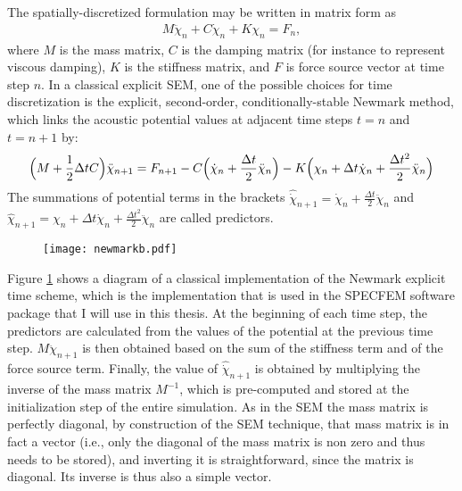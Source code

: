             The spatially-discretized formulation may be written in matrix form as
            \begin{align} \label{eq:sem_35}
                M\ddot{\chi}_{n}+C\dot{\chi}_{n}+K\chi_{n}=F_{n},
            \end{align}
            where $M$ is the mass matrix, $C$ is the damping matrix (for instance to represent viscous damping), $K$ is the stiffness matrix,
and $F$ is force source vector at time step $n$.
In a classical explicit SEM,
one of the possible choices for time discretization is the explicit, second-order, conditionally-stable Newmark method, which links the acoustic potential values at
adjacent time steps $t=n$ and $t=n+1$ \citep{Hug87} by:
            \begin{align} \label{eq:sem_36}
                \Bigl( M+\frac{1}{2}\Delta t C \Bigr)\ddot{\chi}_{n+1} = F_{n+1}-C\Bigl( \dot{\chi}_n+\frac{\Delta t}{2}\ddot{\chi}_n\Bigr)-K\Bigl(
\chi_n+\Delta t \dot{\chi}_n+\frac{\Delta t^2}{2}\ddot{\chi}_n\Bigr)
            \end{align}
            The summations of potential terms in the brackets $\hat{\dot{\chi}}_{n+1}=\dot{\chi}_n + \frac{\Delta t}{2} \ddot{\chi}_n$ and $\hat{\chi}_{n+1} =
\chi_{n}+ \Delta t \dot{\chi}_n + \frac{\Delta t^2}{2}\ddot{\chi}_n$ are called predictors.

            \begin{figure}[htbp]
                 \centerline{\texttt{[image: newmarkb.pdf]}}
                \label{fig:newmarkb}
            \end{figure}
%
            Figure \ref{fig:newmarkb} shows a diagram of a classical implementation of the Newmark explicit time scheme,
which is the implementation that is used in the SPECFEM software package that I will use in this thesis. At the beginning of each time step, the predictors are calculated from the
values of the potential at the previous time step. $M\ddot{\chi}_{n+1}$ is then obtained based on the sum of the stiffness term and of the force source term.
Finally, the value of $\hat{\dot{\chi}}_{n+1}$ is obtained
by multiplying the inverse of the mass matrix $M^{-1}$, which is pre-computed and stored at the initialization step of the entire simulation.
As in the SEM the mass matrix is perfectly diagonal, by construction of the SEM technique, that mass matrix is in fact a vector (i.e., only the diagonal of the mass matrix is non zero
and thus needs to be stored), and inverting it is straightforward, since the matrix is diagonal. Its inverse is thus also a simple vector.


